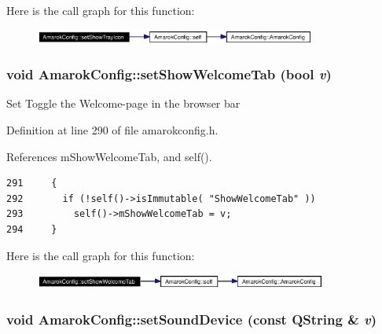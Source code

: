 Here is the call graph for this function:\begin{figure}[H]
\begin{center}
\leavevmode
\includegraphics[width=262pt]{classAmarokConfig_AmarokConfige23_cgraph}
\end{center}
\end{figure}
\subsubsection{\setlength{\rightskip}{0pt plus 5cm}void Amarok\-Config::set\-Show\-Welcome\-Tab (bool {\em v})\hspace{0.3cm}{\tt  [inline, static]}}\label{classAmarokConfig_AmarokConfige29}


Set Toggle the Welcome-page in the browser bar 

Definition at line 290 of file amarokconfig.h.

References m\-Show\-Welcome\-Tab, and self().



\footnotesize\begin{verbatim}291     {
292       if (!self()->isImmutable( "ShowWelcomeTab" ))
293         self()->mShowWelcomeTab = v;
294     }
\end{verbatim}\normalsize 


Here is the call graph for this function:\begin{figure}[H]
\begin{center}
\leavevmode
\includegraphics[width=272pt]{classAmarokConfig_AmarokConfige29_cgraph}
\end{center}
\end{figure}
\subsubsection{\setlength{\rightskip}{0pt plus 5cm}void Amarok\-Config::set\-Sound\-Device (const QString \& {\em v})\hspace{0.3cm}{\tt  [inline, static]}}\label{classAmarokConfig_AmarokConfige63}


